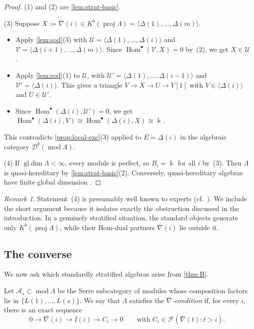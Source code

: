 \documentclass[11pt,reqno]{amsart}
\theoremstyle{plain}
\theoremstyle{definition}
\theoremstyle{remark}
\newtheorem{remark}[theorem]{Remark}
\newcommand{\kk}{\Bbbk}
\DeclareMathOperator{\Hom}{Hom}
\DeclareMathOperator{\gldim}{gl.dim}
\newcommand{\modd}{\operatorname{mod}}
\newcommand{\proj}{\operatorname{proj}}
\newcommand{\Db}{\mathcal{D}^b}
\newcommand{\Kb}{K^b}
\newcommand{\thick}[1]{\langle #1\rangle}
\newcommand{\nablabar}{\overline{\nabla}}
\newcommand{\cA}{\mathcal{A}}
\newcommand{\cF}{\mathcal{F}}
\newcommand{\cU}{\mathcal{U}}
\newcommand{\cV}{\mathcal{V}}
\begin{document}
\begin{proof}
(1) and (2) are \cref{lem:strat-basic}.

(3) Suppose $X:=\nablabar(i)\in\Kb(\proj\Lambda)=\thick{\Delta(1),\dots,\Delta(m)}$.
\begin{itemize}
\item Apply \cref{lem:sod}(3) with $\cU=\thick{\Delta(1),\dots,\Delta(i)}$ and $\cV=\thick{\Delta(i+1),\dots,\Delta(m)}$. Since $\Hom^\bullet(\cV,X)=0$ by~(2), we get $X\in\cU$.
\item Apply \cref{lem:sod}(1) to $\cU$, with $\cU'=\thick{\Delta(1),\dots,\Delta(i-1)}$ and $\cV'=\thick{\Delta(i)}$. This gives a triangle $V\to X\to U\to V[1]$ with $V\in\thick{\Delta(i)}$ and $U\in\cU'$.
\item Since $\Hom^\bullet(\Delta(i),\cU')=0$, we get $\Hom^\bullet(\Delta(i),V)\cong\Hom^\bullet(\Delta(i),X)\cong\kk$.
\end{itemize}
This contradicts \cref{prop:local-exc}(3) applied to $E=\Delta(i)$ in the algebraic category $\Db(\modd\Lambda)$.

(4) If $\gldim\Lambda<\infty$, every module is perfect, so $B_i=\kk$ for all $i$ by~(3). Then $\Lambda$ is quasi-hereditary by \cref{lem:strat-basic}(2). Conversely, quasi-hereditary algebras have finite global dimension \cite{CPS88,DR92}.
\end{proof}

\begin{remark}
Statement~(4) is presumably well known to experts (cf.\ \cite{AHLU00,Dla96}). We include the short argument because it isolates exactly the obstruction discussed in the introduction. In a genuinely stratified situation, the standard objects generate only $\Kb(\proj\Lambda)$, while their Hom-dual partners $\nablabar(i)$ lie outside it.
\end{remark}

\subsection{The converse}
We now ask which standardly stratified algebras arise from \cref{thm:B}.

Let $\cA_s\subset\modd\Lambda$ be the Serre subcategory of modules whose composition factors lie in $\{L(1),\dots,L(s)\}$. We say that $\Lambda$ satisfies the \emph{$\nablabar$-condition} if, for every $i$, there is an exact sequence
\[0\to\nablabar(i)\to I(i)\to C_i\to0\qquad\text{with } C_i\in\cF(\nablabar(t):t>i).\]
\end{document}
